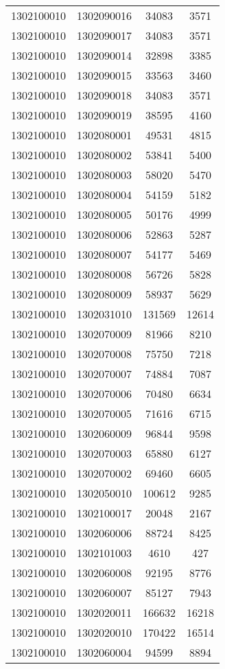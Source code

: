 \begin{longtable}{llcc}
1302100010 & 1302090016 & 34083 & 3571\\
1302100010 & 1302090017 & 34083 & 3571\\
1302100010 & 1302090014 & 32898 & 3385\\
1302100010 & 1302090015 & 33563 & 3460\\
1302100010 & 1302090018 & 34083 & 3571\\
1302100010 & 1302090019 & 38595 & 4160\\
1302100010 & 1302080001 & 49531 & 4815\\
1302100010 & 1302080002 & 53841 & 5400\\
1302100010 & 1302080003 & 58020 & 5470\\
1302100010 & 1302080004 & 54159 & 5182\\
1302100010 & 1302080005 & 50176 & 4999\\
1302100010 & 1302080006 & 52863 & 5287\\
1302100010 & 1302080007 & 54177 & 5469\\
1302100010 & 1302080008 & 56726 & 5828\\
1302100010 & 1302080009 & 58937 & 5629\\
1302100010 & 1302031010 & 131569 & 12614\\
1302100010 & 1302070009 & 81966 & 8210\\
1302100010 & 1302070008 & 75750 & 7218\\
1302100010 & 1302070007 & 74884 & 7087\\
1302100010 & 1302070006 & 70480 & 6634\\
1302100010 & 1302070005 & 71616 & 6715\\
1302100010 & 1302060009 & 96844 & 9598\\
1302100010 & 1302070003 & 65880 & 6127\\
1302100010 & 1302070002 & 69460 & 6605\\
1302100010 & 1302050010 & 100612 & 9285\\
1302100010 & 1302100017 & 20048 & 2167\\
1302100010 & 1302060006 & 88724 & 8425\\
1302100010 & 1302101003 & 4610 & 427\\
1302100010 & 1302060008 & 92195 & 8776\\
1302100010 & 1302060007 & 85127 & 7943\\
1302100010 & 1302020011 & 166632 & 16218\\
1302100010 & 1302020010 & 170422 & 16514\\
1302100010 & 1302060004 & 94599 & 8894\\

\end{longtable}
